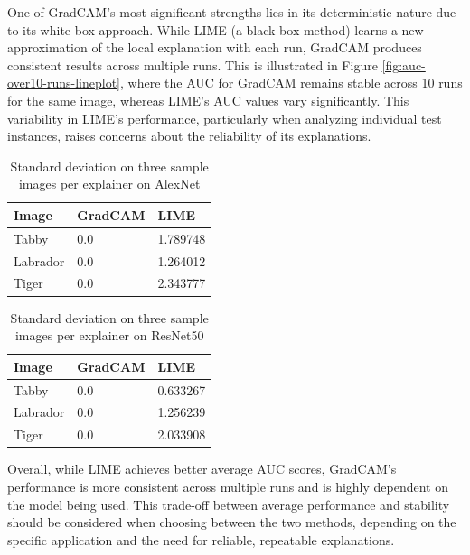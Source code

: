 \documentclass{article}
\begin{document}
One of GradCAM’s most significant strengths lies in its deterministic nature due to its white-box approach. While LIME (a black-box method) learns a new approximation of the local explanation with each run, GradCAM produces consistent results across multiple runs. This is illustrated in Figure \ref{fig:auc-over10-runs-lineplot}, where the AUC for GradCAM remains stable across 10 runs for the same image, whereas LIME’s AUC values vary significantly. This variability in LIME’s performance, particularly when analyzing individual test instances, raises concerns about the reliability of its explanations.

\begin{table}
    \centering
    \begin{tabular}{lll}
        \hline
        Image       & GradCAM & LIME   \\
        \hline
        Tabby       & 0.0    &  1.789748    \\
        Labrador    & 0.0    &  1.264012    \\
        Tiger       & 0.0    &  2.343777    \\
        \hline
    \end{tabular}
    \caption{Standard deviation on three sample images per explainer on AlexNet}
    \label{tab:table2}
\end{table}

\begin{table}
    \centering
    \begin{tabular}{lll}
        \hline
        Image       & GradCAM & LIME   \\
        \hline
        Tabby       & 0.0    &  0.633267    \\
        Labrador    & 0.0    &  1.256239    \\
        Tiger       & 0.0    &  2.033908    \\
        \hline
    \end{tabular}
    \caption{Standard deviation on three sample images per explainer on ResNet50}
    \label{tab:table3}
\end{table}

Overall, while LIME achieves better average AUC scores, GradCAM’s performance is more consistent across multiple runs and is highly dependent on the model being used. This trade-off between average performance and stability should be considered when choosing between the two methods, depending on the specific application and the need for reliable, repeatable explanations.
\end{document}
